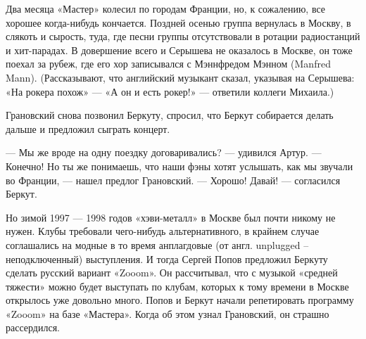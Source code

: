\documentclass[16pt,a5paper,oneside]{book}
\begin{document}
Два месяца «Мастер» колесил по городам Франции, но, к сожалению, все хорошее когда-нибудь кончается. Поздней осенью
группа вернулась в Москву, в слякоть и сырость, туда, где песни группы отсутствовали в ротации радиостанций и
хит-парадах. В довершение всего и Серышева не оказалось в Москве, он тоже поехал за рубеж, где его хор записывался с
Мэннфредом Мэнном (Manfred Mann). (Рассказывают, что английский музыкант сказал, указывая на Серышева: «На рокера похож»
— «А он и есть рокер!» — ответили коллеги Михаила.)

Грановский снова позвонил Беркуту, спросил, что Беркут собирается делать дальше и предложил сыграть концерт.

— Мы же вроде на одну поездку договаривались? — удивился Артур.
— Конечно! Но ты же понимаешь, что наши фэны хотят услышать, как мы звучали во Франции, — нашел предлог Грановский.
— Хорошо! Давай! — согласился Беркут.

Но зимой 1997 — 1998 годов «хэви-металл» в Москве был почти никому не нужен. Клубы требовали чего-нибудь
альтернативного, в крайнем случае соглашались на модные в то время анплагдовые (от англ. unplugged – неподключенный)
выступления. И тогда Сергей Попов предложил Беркуту сделать русский вариант «Zooom». Он рассчитывал, что с музыкой
«средней тяжести» можно будет выступать по клубам, которых к тому времени в Москве открылось уже довольно много. Попов и
Беркут начали репетировать программу «Zooom» на базе «Мастера». Когда об этом узнал Грановский, он страшно рассердился.
\end{document}
